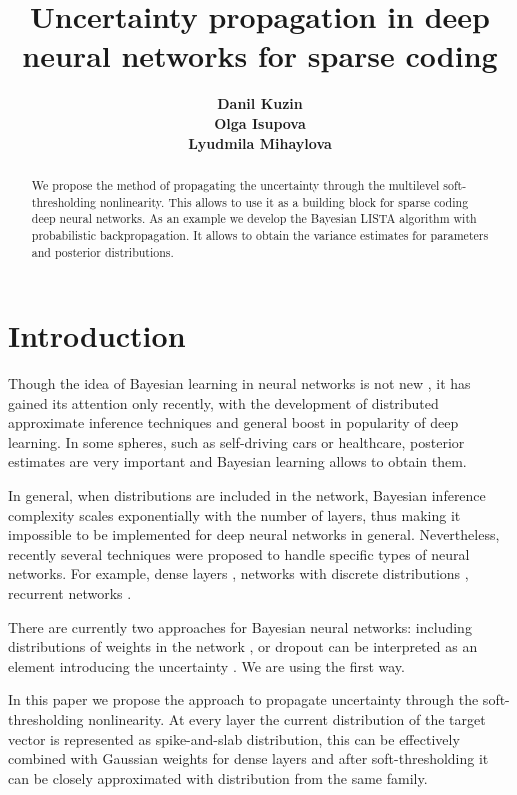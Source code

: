 \documentclass[letterpaper]{article}
\title{Uncertainty propagation in deep neural networks for sparse coding}
\author{} %
\author{ {\bf Danil Kuzin} \\
\And
{\bf Olga Isupova}  \\
\And
{\bf Lyudmila Mihaylova}   \\
}
\begin{document}
\maketitle

\begin{abstract}
We propose the method of propagating the uncertainty through the multilevel soft-thresholding nonlinearity. This allows to use it as a building block for sparse coding deep neural networks. As an example we develop the Bayesian LISTA algorithm with probabilistic backpropagation. It allows to obtain the variance estimates for parameters and posterior distributions.
\end{abstract}

\section{Introduction}
Though the idea of Bayesian learning in neural networks is not new \cite{neal2012bayesian}, it has gained its attention only recently, with the development of distributed approximate inference techniques \cite{li2015stochastic, hoffman2013stochastic}  and general boost in popularity of deep learning. In some spheres, such as self-driving cars or healthcare, posterior estimates are very important and Bayesian learning allows to obtain them. 

In general, when distributions are included in the network, Bayesian inference complexity scales exponentially with the number of layers, thus making it impossible to be implemented for deep neural networks in general. Nevertheless, recently several techniques were proposed to handle specific types of neural networks. For example, dense layers \cite{hernandez2015probabilistic}, networks with discrete distributions \cite{soudry2014expectation}, recurrent networks \cite{mcdermott2017bayesian}. 

There are currently two approaches for Bayesian neural networks: including distributions of weights in the network \cite{hernandez2015probabilistic, ranganath2015deep}, or dropout can be interpreted as an element introducing the uncertainty \cite{gal2016dropout}. We are using the first way.

In this paper we propose the approach to propagate uncertainty through the soft-thresholding nonlinearity. At every layer the current distribution of the target vector is represented as spike-and-slab distribution, this can be effectively combined with Gaussian weights for dense layers and after soft-thresholding it can be closely approximated with distribution from the same family.
\end{document}
